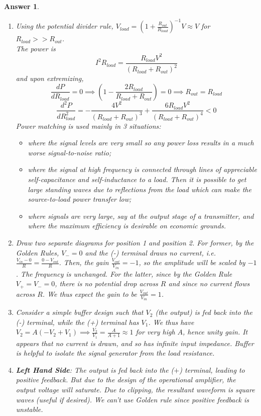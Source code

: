 \documentclass[a4paper]{article}
\newtheorem{ans}{Answer}[section]
\theoremstyle{new}
\begin{document}
\begin{ans}\leavevmode
\begin{enumerate}[label=(\alph*)]
\item Using the potential divider rule, $V_{load}=(1+\frac{R_{out}}{R_{load}})^{-1}V\approx V$ for $R_{load}>>R_{out}$.\\[5pt]
The power is $$I^2R_{load}=\frac{R_{load}V^2}{(R_{load}+R_{out})^2}$$
and upon extremizing,
$$\frac{dP}{dR_{load}}=0\implies (1-\frac{2R_{load}}{R_{load}+R_{out}})=0\implies R_{out}=R_{load}$$
$$\frac{d^2P}{dR_{load}^2}=-\frac{4V^2}{(R_{load}+R_{out})^3}+\frac{6R_{load}V^2}{(R_{load}+R_{out})^4}<0$$ 
Power matching is used mainly in 3 situations:
\begin{itemize}
    \item where the signal levels are very small so any power loss results in a much worse signal-to-noise ratio;
    \item where the signal at high frequency is connected through lines of appreciable self-capacitance and self-inductance to a load. Then it is possible to get large standing waves due to reflections from the load which can make the source-to-load power transfer low;
    \item where signals are very large, say at the output stage of a transmitter, and where the maximum efficiency is desirable on economic grounds.
\end{itemize}
\item Draw two separate diagrams for position 1 and position 2. For former, by the Golden Rules, $V_-=0$ and the (-) terminal draws no current, i.e. $\frac{V_{in}-0}{R}=\frac{0-V_{out}}{R}$. Then, the gain $\frac{V_{out}}{V_{in}}=-1$, so the amplitude will be scaled by $-1$. The frequency is unchanged. For the latter, since by the Golden Rule $V_+=V_-=0$, there is no potential drop across $R$ and since no current flows across $R$. We thus expect the gain to be $\frac{V_{out}}{V_{in}}=1$.
\item Consider a simple buffer design such that $V_2$ (the output) is fed back into the (-) terminal, while the (+) terminal has $V_1$. We thus have $V_2=A(-V_2+V_1)\implies\frac{V_2}{V_1}=\frac{A}{A+1}\approx1$ for very high $A$, hence unity gain. It appears that no current is drawn, and so has infinite input impedance. Buffer is helpful to isolate the signal generator from the load resistance.
\item \textbf{Left Hand Side}: The output is fed back into the ($+$) terminal, leading to positive feedback. But due to the design of the operational amplifier, the output voltage will saturate. Due to clipping, the resultant waveform is square waves (useful if desired). We can't use Golden rule since positive feedback is unstable. \\[5pt]

\end{enumerate}
\end{ans}
\end{document}
